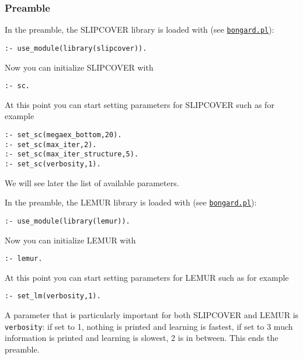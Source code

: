 \subsubsection{Preamble}
In the preamble, the SLIPCOVER library is loaded with (see \href{http://cplint.eu/example/learning/bongard.pl}{\texttt{bongard.pl}}):
\begin{verbatim}
:- use_module(library(slipcover)).
\end{verbatim}
Now you can initialize SLIPCOVER with
\begin{verbatim}
:- sc.
\end{verbatim}
At this point you can start setting parameters for SLIPCOVER such as for example
\begin{verbatim}
:- set_sc(megaex_bottom,20).
:- set_sc(max_iter,2).
:- set_sc(max_iter_structure,5).
:- set_sc(verbosity,1).
\end{verbatim}
We will see later the list of available parameters.


In the preamble, the LEMUR library is loaded with (see \href{http://cplint.eu/example/lemur/bongard.pl}{\texttt{bongard.pl}}):
\begin{verbatim}
:- use_module(library(lemur)).
\end{verbatim}
Now you can initialize LEMUR with
\begin{verbatim}
:- lemur.
\end{verbatim}
At this point you can start setting parameters for LEMUR such as for example
\begin{verbatim}
:- set_lm(verbosity,1).
\end{verbatim}
A parameter that is particularly important for both SLIPCOVER and LEMUR is \verb|verbosity|: if set
to 1, nothing is printed and learning is  fastest, if set to 3 much information is printed and learning is slowest, 2 is in between.
This ends the preamble.



